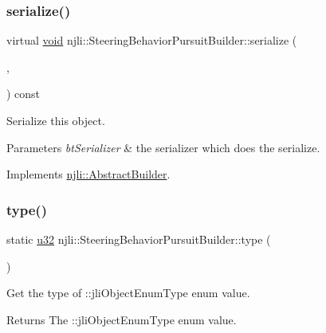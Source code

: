 \subsubsection{\texorpdfstring{serialize()}{serialize()}}
{\footnotesize\ttfamily virtual \mbox{\hyperlink{_thread_8h_af1e856da2e658414cb2456cb6f7ebc66}{void}} njli\+::\+Steering\+Behavior\+Pursuit\+Builder\+::serialize (\begin{DoxyParamCaption}\item[{\mbox{\hyperlink{_thread_8h_af1e856da2e658414cb2456cb6f7ebc66}{void}} $\ast$}]{,  }\item[{bt\+Serializer $\ast$}]{ }\end{DoxyParamCaption}) const\hspace{0.3cm}{\ttfamily [virtual]}}

Serialize this object.


\begin{DoxyParams}{Parameters}
{\em bt\+Serializer} & the serializer which does the serialize. \\
\hline
\end{DoxyParams}


Implements \mbox{\hyperlink{classnjli_1_1_abstract_builder_ab66b774e02ccb9da554c9aab7fa6d981}{njli\+::\+Abstract\+Builder}}.

\mbox{\label{classnjli_1_1_steering_behavior_pursuit_builder_aea1c43fc5260530b4ec5fe127450112d}} 
\subsubsection{\texorpdfstring{type()}{type()}}
{\footnotesize\ttfamily static \mbox{\hyperlink{_util_8h_a10e94b422ef0c20dcdec20d31a1f5049}{u32}} njli\+::\+Steering\+Behavior\+Pursuit\+Builder\+::type (\begin{DoxyParamCaption}{ }\end{DoxyParamCaption})\hspace{0.3cm}{\ttfamily [static]}}

Get the type of \+::jli\+Object\+Enum\+Type enum value.

\begin{DoxyReturn}{Returns}
The \+::jli\+Object\+Enum\+Type enum value. 
\end{DoxyReturn}



